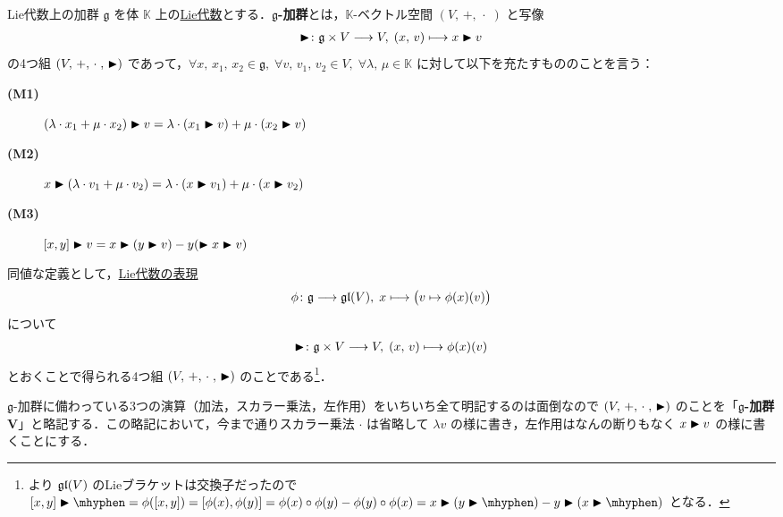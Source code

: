 \documentclass[rep_main]{subfiles}
\begin{document}
\begin{myaxiom}[label=ax:g-module]{Lie代数上の加群}
    $\mathfrak{g}$ を体 $\mathbb{K}$ 上の\hyperref[ax:LieAlg]{Lie代数}とする．$\bm{\mathfrak{g}}$\textbf{-加群}とは，$\mathbb{K}$-ベクトル空間 $(V,\, +,\, \cdot\;)$ と写像
    \begin{align}
        \blacktriangleright \colon \mathfrak{g} \times V \longrightarrow V,\; (x,\, v) \longmapsto x \blacktriangleright v
    \end{align}
    の4つ組 $(V,\, +,\, \cdot\;,\, \blacktriangleright)$ であって，$\forall x,\, x_1,\, x_2 \in \mathfrak{g},\; \forall v,\, v_1,\, v_2 \in V,\; \forall \lambda,\, \mu \in \mathbb{K}$ に対して以下を充たすもののことを言う：
    \begin{description}
        \item[\textbf{(M1)}] $(\lambda \cdot x_1 + \mu \cdot x_2) \blacktriangleright v = \lambda \cdot (x_1 \blacktriangleright v) + \mu \cdot (x_2 \blacktriangleright v)$
        \item[\textbf{(M2)}] $x \blacktriangleright (\lambda \cdot v_1 + \mu \cdot v_2) = \lambda \cdot (x \blacktriangleright v_1) + \mu \cdot (x \blacktriangleright v_2)$
        \item[\textbf{(M3)}] $\comm{x}{y} \btr v = x \btr (y \btr v) - y (\btr x \btr v)$
    \end{description}
    \tcblower
    同値な定義として，\hyperref[def:rep-LieAlg]{Lie代数の表現}
    \begin{align}
        \phi \colon \mathfrak{g} \longrightarrow \mathfrak{gl} (V),\; x \longmapsto \bigl( v \mapsto \phi(x)(v) \bigr) 
    \end{align}
    について
    \begin{align}
        \blacktriangleright \colon \mathfrak{g} \times V \longrightarrow V,\; (x,\, v) \longmapsto \phi(x)(v)
    \end{align}
    とおくことで得られる4つ組 $(V,\, +,\, \cdot\;,\, \blacktriangleright)$ のことである\footnote{より $\mathfrak{gl} (V)$ のLieブラケットは交換子だったので $\comm{x}{y} \btr \mhyphen = \phi(\comm{x}{y}) = \comm{\phi(x)}{\phi(y)} = \phi(x) \circ \phi(y) - \phi(y) \circ \phi(x) = x \btr (y\btr \mhyphen) - y \btr (x \btr \mhyphen)$ となる．}．
\end{myaxiom}

\begin{marker}
    $\mathfrak{g}$-加群に備わっている3つの演算（加法，スカラー乗法，左作用）をいちいち全て明記するのは面倒なので $(V,\, +,\, \cdot\;,\, \blacktriangleright)$ のことを「$\bm{\mathfrak{g}}$\textbf{-加群} $\bm{V}$」と略記する．この略記において，今まで通りスカラー乗法 $\cdot$ は省略して $\lambda v$ の様に書き，左作用はなんの断りもなく $x \blacktriangleright v$ の様に書くことにする．
\end{marker}
\end{document}
